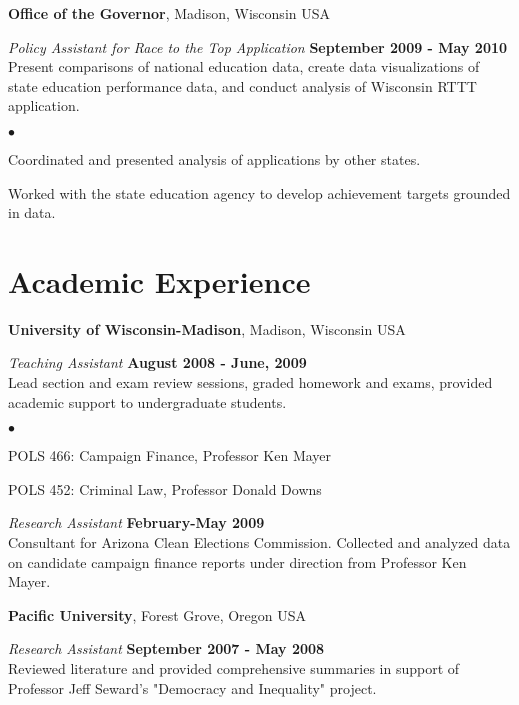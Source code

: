 \documentclass[margin,line]{res}
\newenvironment{list2}{
  \begin{list}{$\bullet$}{%
      \setlength{\itemsep}{0in}
      \setlength{\parsep}{0in} \setlength{\parskip}{0in}
      \setlength{\topsep}{0in} \setlength{\partopsep}{0in} 
      \setlength{\leftmargin}{0.2in}}}{\end{list}}
\begin{document}
\begin{resume}
{\bf Office of the Governor}, Madison, Wisconsin USA

{\em Policy Assistant for Race to the Top Application} \hfill {\bf September 2009 - May 2010}\\
Present comparisons of national education data, create data visualizations of state education performance data, and conduct analysis of Wisconsin RTTT application. 
\begin{list2}
\item Coordinated and presented analysis of applications by other states.
\item Worked with the state education agency to develop achievement targets grounded in data.
\end{list2}



\section{\sc Academic Experience}
{\bf University of Wisconsin-Madison}, Madison, Wisconsin USA

\vspace{-.1cm}
{\em Teaching Assistant} \hfill {\bf August 2008 - June, 2009}\\
Lead section and exam review sessions, graded homework and exams, provided academic support to undergraduate students.
\vspace*{.05in}  
\begin{list2}
\item POLS 466: Campaign Finance, Professor Ken Mayer
\item POLS 452: Criminal Law, Professor Donald Downs
\end{list2}


{\em Research Assistant} \hfill {\bf February-May 2009}\\
Consultant for Arizona Clean Elections Commission. Collected and analyzed data on candidate campaign finance reports under direction from Professor Ken Mayer. 
\vspace*{.05in}  


{\bf Pacific University}, Forest Grove, Oregon USA

\vspace{-.3cm}
{\em Research Assistant} \hfill {\bf September 2007 - May 2008}\\
Reviewed literature and provided comprehensive summaries in support of Professor Jeff Seward's "Democracy and Inequality" project.


\end{resume}
\end{document}
